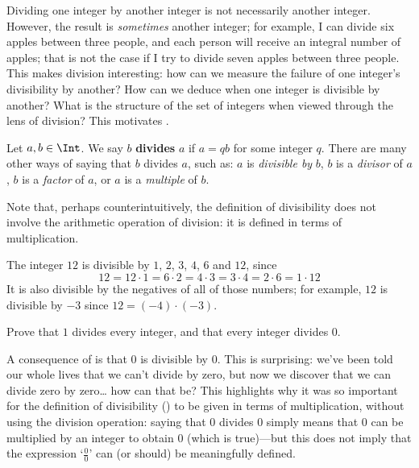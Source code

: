 Dividing one integer by another integer is not necessarily another integer. However, the result is \textit{sometimes} another integer; for example, I can divide six apples between three people, and each person will receive an integral number of apples; that is not the case if I try to divide seven apples between three people. This makes division interesting: how can we measure the failure of one integer's divisibility by another? How can we deduce when one integer is divisible by another? What is the structure of the set of integers when viewed through the lens of division? This motivates .

\begin{definition}
\label{defDivisionPreliminary}
Let $a,b \in \Int$. We say $b$ \textbf{divides} $a$ if $a=qb$ for some integer $q$. There are many other ways of saying that $b$ divides $a$, such as: $a$ is \textit{divisible by} $b$, $b$ is a \textit{divisor} of $a$, $b$ is a \textit{factor} of $a$, or $a$ is a \textit{multiple} of $b$.
\end{definition}

Note that, perhaps counterintuitively, the definition of divisibility does not involve the arithmetic operation of division: it is defined in terms of multiplication.

\begin{example}
The integer $12$ is divisible by $1$, $2$, $3$, $4$, $6$ and $12$, since
\[ 12 = 12 \cdot 1 = 6 \cdot 2 = 4 \cdot 3 = 3 \cdot 4 = 2 \cdot 6 = 1 \cdot 12 \]
It is also divisible by the negatives of all of those numbers; for example, $12$ is divisible by $-3$ since $12 = (-4) \cdot (-3)$.
\end{example}

\begin{exercise}
\label{exOneDividesEveryIntegerDividesZero}
Prove that $1$ divides every integer, and that every integer divides $0$.
\end{exercise}

A consequence of  is that $0$ is divisible by $0$. This is surprising: we've been told our whole lives that we can't divide by zero, but now we discover that we can divide zero by zero\dots{} how can that be? This highlights why it was so important for the definition of divisibility () to be given in terms of multiplication, without using the division operation: saying that $0$ divides $0$ simply means that $0$ can be multiplied by an integer to obtain $0$ (which is true)---but this does not imply that the expression `$\frac{0}{0}$' can (or should) be meaningfully defined.

